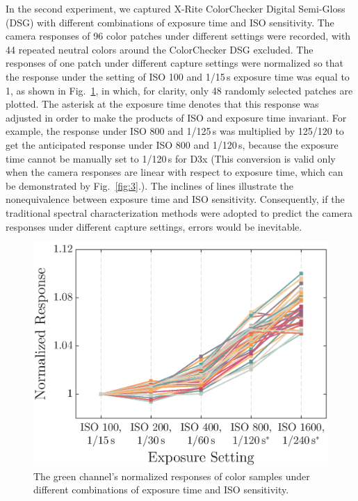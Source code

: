 \documentclass[9pt,twocolumn,twoside]{osajnl}
\begin{document}
In the second experiment, we captured X-Rite ColorChecker Digital Semi-Gloss (DSG) with different combinations of exposure time and ISO sensitivity. The camera responses of 96 color patches under different settings were recorded, with 44 repeated neutral colors around the ColorChecker DSG excluded. The responses of one patch under different capture settings were normalized so that the response under the setting of ISO 100 and 1/15\,s exposure time was equal to 1, as shown in Fig.~\ref{fig:2}, in which, for clarity, only 48 randomly selected patches are plotted. The asterisk at the exposure time denotes that this response was adjusted in order to make the products of ISO and exposure time invariant. For example, the response under ISO 800 and 1/125\,s was multiplied by 125/120 to get the anticipated response under ISO 800 and 1/120\,s, because the exposure time cannot be manually set to 1/120\,s for D3x (This conversion is valid only when the camera responses are linear with respect to exposure time, which can be demonstrated by Fig.~\ref{fig:3}.). The inclines of lines illustrate the nonequivalence between exposure time and ISO sensitivity. Consequently, if the traditional spectral characterization methods were adopted to predict the camera responses under different capture settings, errors would be inevitable.

\begin{figure}[tbp]
	\centering
	\includegraphics[width=.75\linewidth]{Fig2}
	\caption{The green channel’s normalized responses of color samples under different combinations of exposure time and ISO sensitivity.}
	\label{fig:2}
\end{figure}
\end{document}
